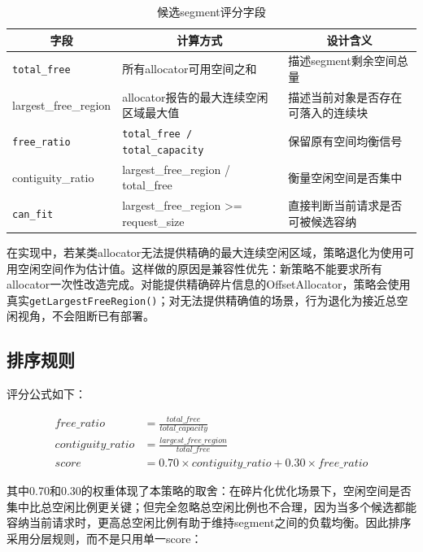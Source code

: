 \documentclass[UTF8,zihao=-4,a4paper]{ctexart}
\newcommand{\artifact}[1]{\texttt{#1}}
\newcommand{\smallartifact}[1]{{\ttfamily\footnotesize #1}}
\newcommand{\mvar}[1]{\mathit{#1}}
\newcommand{\thfirst}[1]{\multicolumn{1}{|c|}{\bfseries #1}}
\newcommand{\thcell}[1]{\multicolumn{1}{c|}{\bfseries #1}}
\begin{document}
\begin{table}[htbp]
  \centering
  \caption{候选segment评分字段}
  \label{tab:score-fields}
  \begin{tabularx}{\textwidth}{|B{3.8cm}|L{4.8cm}|Y|}
    \hline
    \thfirst{字段} & \thcell{计算方式} & \thcell{设计含义} \\ \hline
    \artifact{total\_free} & 所有allocator可用空间之和 & 描述segment剩余空间总量 \\ \hline
    \smallartifact{largest\_free\_region} & allocator报告的最大连续空闲区域最大值 & 描述当前对象是否存在可落入的连续块 \\ \hline
    \artifact{free\_ratio} & \artifact{total\_free / total\_capacity} & 保留原有空间均衡信号 \\ \hline
    \smallartifact{contiguity\_ratio} & \smallartifact{largest\_free\_region / total\_free} & 衡量空闲空间是否集中 \\ \hline
    \artifact{can\_fit} & \smallartifact{largest\_free\_region >= request\_size} & 直接判断当前请求是否可被候选容纳 \\ \hline
  \end{tabularx}
\end{table}

在实现中，若某类allocator无法提供精确的最大连续空闲区域，策略退化为使用可用空闲空间作为估计值。这样做的原因是兼容性优先：新策略不能要求所有allocator一次性改造完成。对能提供精确碎片信息的OffsetAllocator，策略会使用真实\artifact{getLargestFreeRegion()}；对无法提供精确值的场景，行为退化为接近总空闲视角，不会阻断已有部署。

\subsection{排序规则}

评分公式如下：

\begin{align}
  \mvar{free\_ratio} &= \frac{\mvar{total\_free}}{\mvar{total\_capacity}} \\
  \mvar{contiguity\_ratio} &= \frac{\mvar{largest\_free\_region}}{\mvar{total\_free}} \\
  \mvar{score} &= 0.70\times \mvar{contiguity\_ratio}+0.30\times \mvar{free\_ratio}
\end{align}

其中0.70和0.30的权重体现了本策略的取舍：在碎片化优化场景下，空闲空间是否集中比总空闲比例更关键；但完全忽略总空闲比例也不合理，因为当多个候选都能容纳当前请求时，更高总空闲比例有助于维持segment之间的负载均衡。因此排序采用分层规则，而不是只用单一score：
\end{document}
